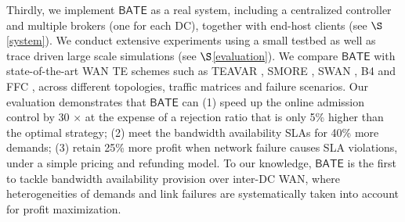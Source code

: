 \documentclass[sigconf]{acmart}
\begin{document}
Thirdly, 
we implement $\mathsf{BATE}$ as a real system, including a centralized controller and multiple brokers (one for each DC),  together with end-host clients (see $\S$\ref{system}).
 We conduct extensive experiments using a small testbed as well as trace driven large scale simulations (see $\S$\ref{evaluation}).
We compare  $\mathsf{BATE}$ with state-of-the-art WAN TE schemes such as TEAVAR \cite{Teavar}, SMORE \cite{SMORE}, SWAN \cite{swan}, B4 \cite{B4} and FFC \cite{FFC}, across different topologies, traffic matrices and failure scenarios.
Our evaluation demonstrates that $\mathsf{BATE}$ can 
(1) speed up the online admission control by 30 $\times $ at the expense of a rejection ratio that is only 5\% higher than the optimal strategy;
(2) meet the bandwidth availability SLAs for 40\% more demands;
(3) retain 25\% more profit when network failure causes SLA violations, under a simple pricing and refunding model. 
To our knowledge, $\mathsf{BATE}$ is the first to tackle bandwidth availability provision over inter-DC WAN, where heterogeneities of demands and link failures are systematically taken into account for profit maximization.  

%
\end{document}
